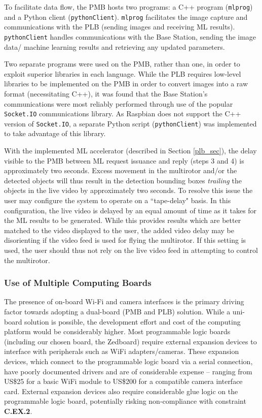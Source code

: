 To facilitate data flow, the PMB hosts two programs: a C++ program (\texttt{mlprog}) and a Python client (\texttt{pythonClient}). \texttt{mlprog} facilitates the image capture and communications with the PLB (sending images and receiving ML results). \texttt{pythonClient} handles communications with the Base Station, sending the image data/ machine learning results and retrieving any updated parameters. 

Two separate programs were used on the PMB, rather than one, in order to exploit superior libraries in each language. While the PLB requires low-level libraries to be implemented on the PMB in order to convert images into a raw format (necessitating C++), it was found that the Base Station's communications were most reliably performed through use of the popular \texttt{Socket.IO} communications library. As Raspbian does not support the C++ version of \texttt{Socket.IO}, a separate Python script (\texttt{pythonClient}) was implemented to take advantage of this library.

With the implemented ML accelerator (described in Section \ref{plb_sec}), the delay visible to the PMB between ML request issuance and reply (steps 3 and 4) is approximately two seconds. Excess movement in the multirotor and/or the detected objects will thus result in the detection bounding boxes \textit{trailing} the objects in the live video by approximately two seconds. To resolve this issue the user may configure the system to operate on a ``tape-delay" basis. In this configuration, the live video is delayed by an equal amount of time as it takes for the ML results to be generated. While this provides results which are better matched to the video displayed to the user, the added video delay may be disorienting if the video feed is used for flying the multirotor. If this setting is used, the user should thus not rely on the live video feed in attempting to control the multirotor.

\subsubsection{Use of Multiple Computing Boards}
The presence of on-board Wi-Fi and camera interfaces is the primary driving factor towards adopting a dual-board (PMB and PLB) solution. While a uni-board solution is possible, the development effort and cost of the computing platform would be considerably higher. Most programmable logic boards (including our chosen board, the Zedboard) require external expansion devices to interface with peripherals such as WiFi adapters/cameras. These expansion devices, which connect to the programmable logic board via a serial connection, have poorly documented drivers and are of considerable expense -- ranging from US\$25 for a basic WiFi module\cite{digiwifi} to US\$200 for a compatible camera interface card\cite{digipmod}. External expansion devices also require considerable glue logic on the programmable logic board, potentially risking non-compliance with constraint \textbf{C.EX.2}.

